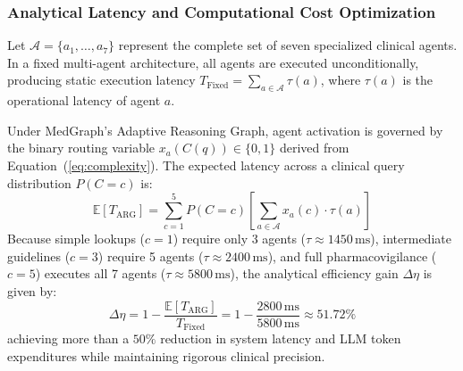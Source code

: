 \documentclass[conference]{IEEEtran}
\begin{document}
\subsubsection{Analytical Latency and Computational Cost Optimization}
Let $\mathcal{A} = \{a_1, \dots, a_7\}$ represent the complete set of seven specialized clinical agents. In a fixed multi-agent architecture, all agents are executed unconditionally, producing static execution latency $T_{\text{Fixed}} = \sum_{a \in \mathcal{A}} \tau(a)$, where $\tau(a)$ is the operational latency of agent $a$.

Under MedGraph's Adaptive Reasoning Graph, agent activation is governed by the binary routing variable $x_a(C(q)) \in \{0, 1\}$ derived from Equation~(\ref{eq:complexity}). The expected latency across a clinical query distribution $P(C = c)$ is:
\begin{equation}
\mathbb{E}[T_{\text{ARG}}] = \sum_{c=1}^5 P(C = c) \left[ \sum_{a \in \mathcal{A}} x_a(c) \cdot \tau(a) \right]
\label{eq:latency}
\end{equation}
Because simple lookups ($c=1$) require only 3 agents ($\tau \approx 1450\,\text{ms}$), intermediate guidelines ($c=3$) require 5 agents ($\tau \approx 2400\,\text{ms}$), and full pharmacovigilance ($c=5$) executes all 7 agents ($\tau \approx 5800\,\text{ms}$), the analytical efficiency gain $\Delta \eta$ is given by:
\begin{equation}
\Delta \eta = 1 - \frac{\mathbb{E}[T_{\text{ARG}}]}{T_{\text{Fixed}}} = 1 - \frac{2800\,\text{ms}}{5800\,\text{ms}} \approx 51.72\%
\end{equation}
achieving more than a $50\%$ reduction in system latency and LLM token expenditures while maintaining rigorous clinical precision.
\end{document}
